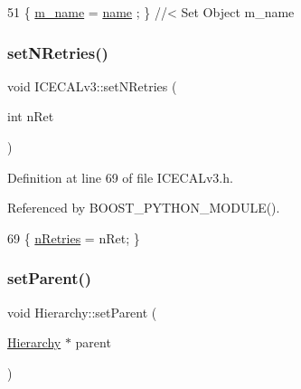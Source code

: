\begin{DoxyCode}
51 \{ \hyperlink{classObject_a8b83c95c705d2c3ba0d081fe1710f48d}{m\_name}  = \hyperlink{classObject_a300f4c05dd468c7bb8b3c968868443c1}{name}  ; \} \textcolor{comment}{//< Set Object m\_name}
\end{DoxyCode}
\mbox{\label{classICECALv3_aae0b7539c0bba5311aab99e000d1be6d}} 
\subsubsection{\texorpdfstring{set\+N\+Retries()}{setNRetries()}}
{\footnotesize\ttfamily void I\+C\+E\+C\+A\+Lv3\+::set\+N\+Retries (\begin{DoxyParamCaption}\item[{int}]{n\+Ret }\end{DoxyParamCaption})\hspace{0.3cm}{\ttfamily [inline]}}



Definition at line 69 of file I\+C\+E\+C\+A\+Lv3.\+h.



Referenced by B\+O\+O\+S\+T\+\_\+\+P\+Y\+T\+H\+O\+N\+\_\+\+M\+O\+D\+U\+L\+E().


\begin{DoxyCode}
69 \{   \hyperlink{classICECALv3_ae877ce34b3a4d6c368cc6409ac9614fa}{nRetries} = nRet;                                \}
\end{DoxyCode}
\mbox{\label{classHierarchy_a585ad1aeec16077a0e532ab8b4fc557b}} 
\subsubsection{\texorpdfstring{set\+Parent()}{setParent()}}
{\footnotesize\ttfamily void Hierarchy\+::set\+Parent (\begin{DoxyParamCaption}\item[{\hyperlink{classHierarchy}{Hierarchy} $\ast$}]{parent }\end{DoxyParamCaption})\hspace{0.3cm}{\ttfamily [inherited]}}



